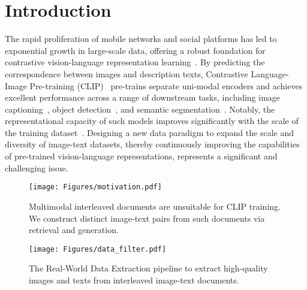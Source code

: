 \section{Introduction}
\label{sec:intro}
The rapid proliferation of mobile networks and social platforms has led to exponential growth in large-scale data, offering a robust foundation for contrastive vision-language representation learning~\cite{guo2019deep,baltruvsaitis2018multimodal, guo2024regiongpt, zhu2024llms, yao2024visual, zheng2024picture, guo2024open}. By predicting the correspondence between images and description texts, Contrastive Language-Image Pre-training (CLIP)~\cite{CLIP} pre-trains separate uni-modal encoders and achieves excellent performance across a range of downstream tasks, including image captioning~\cite{li2023blip,mokady2021clipcap}, object detection~\cite{wu2023cora,lin2023gridclip}, and semantic segmentation~\cite{he2023clip,zhou2023zegclip,lin2023clip}.
Notably, the representational capacity of such models improves significantly with the scale of the training dataset~\cite{li2024scaling}. Designing a new data paradigm to expand the scale and diversity of image-text datasets, thereby continuously improving the capabilities of pre-trained vision-language representations, represents a significant and challenging issue.


\begin{figure}[t!]
    \centering
    \texttt{[image: Figures/motivation.pdf]}
    \caption{Multimodal interleaved documents are unsuitable for CLIP training. We construct distinct image-text pairs from such documents via retrieval and generation.}
    \label{fig: motivation}
    \vspace{-5mm}
\end{figure}

\begin{figure*}[t!]
    \centering
    \texttt{[image: Figures/data\_filter.pdf]}
    \vspace{-3mm}
    \caption{The Real-World Data Extraction pipeline to extract high-quality images and texts from interleaved image-text documents.}
    \vspace{-2mm}
    \label{fig: data_filtering}
\end{figure*}

